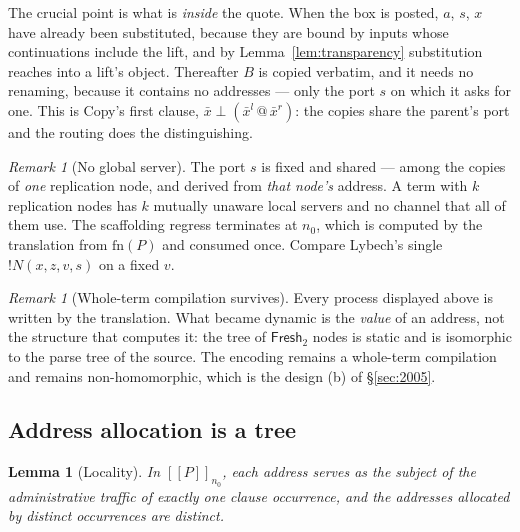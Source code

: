 \documentclass[11pt]{article}
\theoremstyle{definition}
\theoremstyle{plain}
\newtheorem{lemma}[definition]{Lemma}
\theoremstyle{remark}
\newtheorem{remark}[definition]{Remark}
\newcommand{\enc}[1]{[\![#1]\!]}
\newcommand{\Frsh}{\mathsf{Fresh}_2}
\newcommand{\fn}{\mathrm{fn}}
\begin{document}
The crucial point is what is \emph{inside} the quote. When the box is
posted, $a$, $s$, $x$ have already been substituted, because they are
bound by inputs whose continuations include the lift, and by
Lemma~\ref{lem:transparency} substitution reaches into a lift's object.
Thereafter $B$ is copied verbatim, and it needs no renaming, because it
contains no addresses --- only the port $s$ on which it asks for one.
This is Copy's first clause, $\bar x \perp (\bar x^l \mathbin{@} \bar x^r)$:
the copies share the parent's port and the routing does the
distinguishing.

\begin{remark}[No global server]
The port $s$ is fixed and shared --- among the copies of \emph{one}
replication node, and derived from \emph{that node's} address. A term
with $k$ replication nodes has $k$ mutually unaware local servers and no
channel that all of them use. The scaffolding regress terminates at
$n_0$, which is computed by the translation from $\fn(P)$ and consumed
once. Compare Lybech's single $!N(x,z,v,s)$ on a fixed $v$.
\end{remark}

\begin{remark}[Whole-term compilation survives]
Every process displayed above is written by the translation. What became
dynamic is the \emph{value} of an address, not the structure that
computes it: the tree of $\Frsh$ nodes is static and is isomorphic to the
parse tree of the source. The encoding remains a whole-term compilation
and remains non-homomorphic, which is the design (b) of \S\ref{sec:2005}.
\end{remark}

\subsection{Address allocation is a tree}

\begin{lemma}[Locality]\label{lem:locality}
In $\enc{P}_{n_0}$, each address serves as the subject of the
administrative traffic of exactly one clause occurrence, and the addresses
allocated by distinct occurrences are distinct.
\end{lemma}
\end{document}
